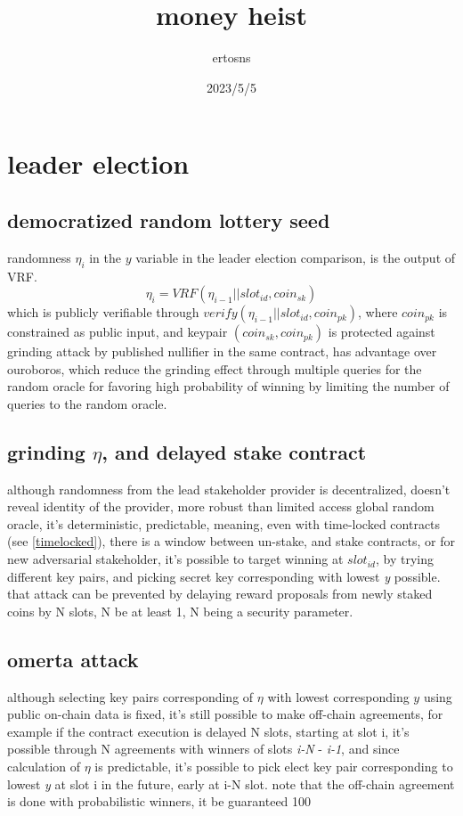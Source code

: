 \documentclass{article}
\begin{document}
\title {money heist}
\author {ertosns}
\date {2023/5/5}
\maketitle

\section {leader election}
\subsection{democratized random lottery seed}
randomness $\eta_i$ in the $y$ variable in the leader election comparison, is the output of VRF.
$$\eta_i=VRF(\eta_{i-1}||slot_{id}, coin_{sk})$$  which is publicly verifiable through $verify(\eta_{i-1}||slot_{id}, coin_{pk})$, where $coin_{pk}$ is constrained as public input, and keypair $(coin_{sk},coin_{pk})$ is protected against grinding attack by published nullifier in the same contract, has advantage over ouroboros, which reduce the grinding effect through multiple queries for the random oracle for favoring high probability of winning by limiting the number of queries to the random oracle.  \cite{ouroboros_genesis}

\subsection {grinding $\eta$, and delayed stake contract}
although randomness from the lead stakeholder provider is decentralized, doesn't reveal identity of the provider, more robust than limited access global random oracle, it's deterministic, predictable, meaning, even with time-locked contracts (see \ref{timelocked}), there is a window between un-stake, and stake contracts, or for new adversarial stakeholder, it's possible to target winning at $slot_{id}$, by trying different key pairs, and picking secret key corresponding with lowest \emph{y} possible.
that attack can be prevented by delaying reward proposals from newly staked coins by N slots, N be at least 1, N being a security parameter.

\subsection {omerta attack}
although selecting key pairs corresponding of $\eta$ with lowest corresponding $y$ using public on-chain data is fixed, it's still possible to make off-chain agreements, for example if the contract execution is delayed N slots, starting at slot i, it's possible through N agreements with winners of slots \emph{i-N} - \emph{i-1}, and since calculation of $\eta$ is predictable, it's possible to pick elect key pair corresponding to lowest \emph{y} at slot i in the future, early at i-N slot.
note that the off-chain agreement is done with probabilistic winners, it be guaranteed 100%
\end{document}
